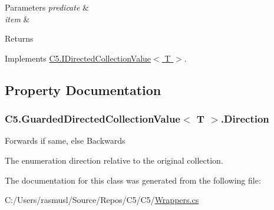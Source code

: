\begin{DoxyParams}{Parameters}
{\em predicate} & \\
\hline
{\em item} & \\
\hline
\end{DoxyParams}
\begin{DoxyReturn}{Returns}

\end{DoxyReturn}


Implements \hyperlink{interface_c5_1_1_i_directed_collection_value_a93725b1f694e0d1cf5827e481ea467b7}{C5.\+I\+Directed\+Collection\+Value$<$ T $>$}.



\subsection{Property Documentation}
\hypertarget{class_c5_1_1_guarded_directed_collection_value_a5062645b3c4338673fa971a7abe5b1e2}{}
\subsubsection[{Direction}]{ {\bf C5.\+Guarded\+Directed\+Collection\+Value}$<$ T $>$.Direction\hspace{0.3cm}{\ttfamily [get]}}\label{class_c5_1_1_guarded_directed_collection_value_a5062645b3c4338673fa971a7abe5b1e2}




{\ttfamily Forwards} if same, else {\ttfamily Backwards} 

The enumeration direction relative to the original collection.

The documentation for this class was generated from the following file\+:\begin{DoxyCompactItemize}
\item 
C\+:/\+Users/rasmusl/\+Source/\+Repos/\+C5/\+C5/\hyperlink{_wrappers_8cs}{Wrappers.\+cs}\end{DoxyCompactItemize}
